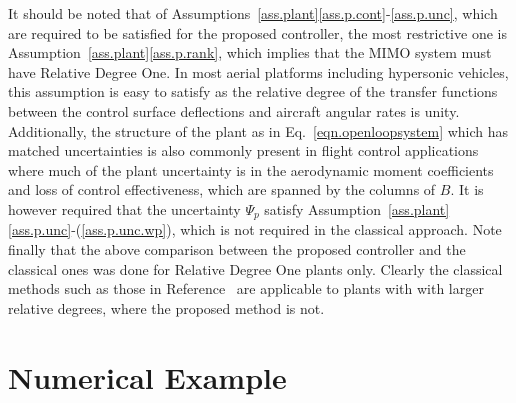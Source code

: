 \documentclass[]{../sty/JGCD}
\theoremstyle{examplestyle}
\begin{document}
  It should be noted that of Assumptions~\ref{ass.plant}\ref{ass.p.cont}-\ref{ass.p.unc}, which are required to be satisfied for the proposed controller, the most restrictive one is Assumption~\ref{ass.plant}\ref{ass.p.rank}, which implies that the MIMO system must have Relative Degree One.
  In most aerial platforms including hypersonic vehicles, this assumption is easy to satisfy as the relative degree of the transfer functions between the control surface deflections and aircraft angular rates is unity.
  Additionally, the structure of the plant as in Eq.\ \eqref{eqn.openloopsystem} which has matched uncertainties is also commonly present in flight control applications where much of the plant uncertainty is in the aerodynamic moment coefficients and loss of control effectiveness, which are spanned by the columns of $B$.
  It is however required that the uncertainty $\Psi_{p}$ satisfy Assumption~\ref{ass.plant}\ref{ass.p.unc}-(\ref{ass.p.unc.wp}), which is not required in the classical approach.
  Note finally that the above comparison between the proposed controller and the classical ones was done for Relative Degree One plants only.
  Clearly the classical methods such as those in Reference\ \cite{narendra.stable.2005} are applicable to plants with with larger relative degrees, where the proposed method is not.

  \section{Numerical Example}\label{sec.example}
\end{document}
